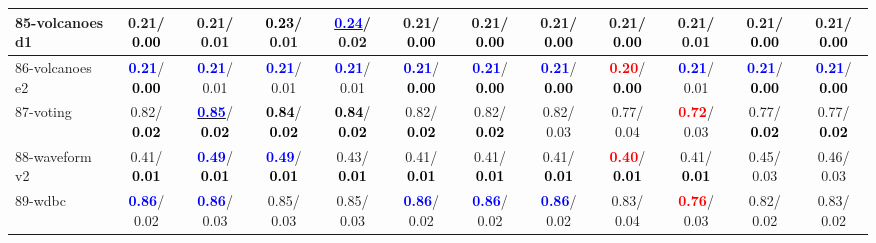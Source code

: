 \begin{table}[h]
\begin{center}
{\begin{tabular}{lc|c|c|c|c|c|c|c|c|c|c}
85-volcanoes d1 &   0.21/\textcolor{black}{\textbf{  0.00}} &   0.21/  0.01 & \textcolor{black}{\textbf{  0.23}}/  0.01 & \underline{\textcolor{blue}{\textbf{  0.24}}}/  0.02 &   0.21/\textcolor{black}{\textbf{  0.00}} &   0.21/\textcolor{black}{\textbf{  0.00}} &   0.21/\textcolor{black}{\textbf{  0.00}} &   0.21/\textcolor{black}{\textbf{  0.00}} &   0.21/  0.01 &   0.21/\textcolor{black}{\textbf{  0.00}} &   0.21/\textcolor{black}{\textbf{  0.00}} \\ \hline
86-volcanoes e2 & \textcolor{blue}{\textbf{  0.21}}/\textcolor{black}{\textbf{  0.00}} & \textcolor{blue}{\textbf{  0.21}}/  0.01 & \textcolor{blue}{\textbf{  0.21}}/  0.01 & \textcolor{blue}{\textbf{  0.21}}/  0.01 & \textcolor{blue}{\textbf{  0.21}}/\textcolor{black}{\textbf{  0.00}} & \textcolor{blue}{\textbf{  0.21}}/\textcolor{black}{\textbf{  0.00}} & \textcolor{blue}{\textbf{  0.21}}/\textcolor{black}{\textbf{  0.00}} & \textcolor{red}{\textbf{  0.20}}/\textcolor{black}{\textbf{  0.00}} & \textcolor{blue}{\textbf{  0.21}}/  0.01 & \textcolor{blue}{\textbf{  0.21}}/\textcolor{black}{\textbf{  0.00}} & \textcolor{blue}{\textbf{  0.21}}/\textcolor{black}{\textbf{  0.00}} \\
87-voting &   0.82/\textcolor{black}{\textbf{  0.02}} & \underline{\textcolor{blue}{\textbf{  0.85}}}/\textcolor{black}{\textbf{  0.02}} & \textcolor{black}{\textbf{  0.84}}/\textcolor{black}{\textbf{  0.02}} & \textcolor{black}{\textbf{  0.84}}/\textcolor{black}{\textbf{  0.02}} &   0.82/\textcolor{black}{\textbf{  0.02}} &   0.82/\textcolor{black}{\textbf{  0.02}} &   0.82/  0.03 &   0.77/  0.04 & \textcolor{red}{\textbf{  0.72}}/  0.03 &   0.77/\textcolor{black}{\textbf{  0.02}} &   0.77/\textcolor{black}{\textbf{  0.02}} \\
88-waveform v2 &   0.41/\textcolor{black}{\textbf{  0.01}} & \textcolor{blue}{\textbf{  0.49}}/\textcolor{black}{\textbf{  0.01}} & \textcolor{blue}{\textbf{  0.49}}/\textcolor{black}{\textbf{  0.01}} &   0.43/\textcolor{black}{\textbf{  0.01}} &   0.41/\textcolor{black}{\textbf{  0.01}} &   0.41/\textcolor{black}{\textbf{  0.01}} &   0.41/\textcolor{black}{\textbf{  0.01}} & \textcolor{red}{\textbf{  0.40}}/\textcolor{black}{\textbf{  0.01}} &   0.41/\textcolor{black}{\textbf{  0.01}} &   0.45/  0.03 &   0.46/  0.03 \\
89-wdbc & \textcolor{blue}{\textbf{  0.86}}/  0.02 & \textcolor{blue}{\textbf{  0.86}}/  0.03 &   0.85/  0.03 &   0.85/  0.03 & \textcolor{blue}{\textbf{  0.86}}/  0.02 & \textcolor{blue}{\textbf{  0.86}}/  0.02 & \textcolor{blue}{\textbf{  0.86}}/  0.02 &   0.83/  0.04 & \textcolor{red}{\textbf{  0.76}}/  0.03 &   0.82/  0.02 &   0.83/  0.02 \\

\end{tabular}}
\end{center}
\end{table}
